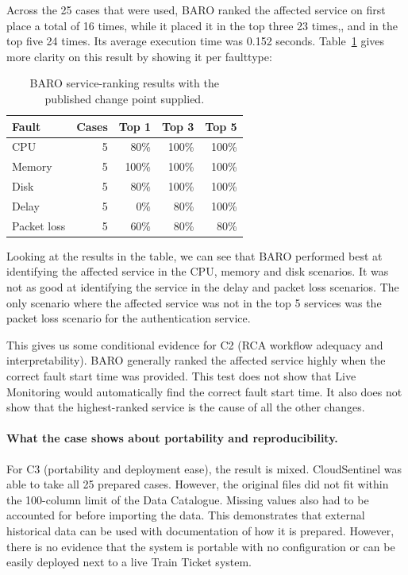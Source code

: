 Across the 25 cases that were used, BARO ranked the affected service on first place a total of 16 times, while it placed it in the top three 23 times,, and in the top five 24 times. Its average execution time was 0.152 seconds. Table~\ref{tab:h9-rcaeval-baro-results} gives more clarity on this result by showing it per faulttype:

\begin{table}[H]
    \centering
    \small
    \caption{BARO service-ranking results with the published change point supplied.}
    \label{tab:h9-rcaeval-baro-results}
    \begin{tabular}{|l|r|r|r|r|}
        \hline
        Fault & Cases & Top 1 & Top 3 & Top 5 \\
        \hline
        CPU & 5 & 80\% & 100\% & 100\% \\
        Memory & 5 & 100\% & 100\% & 100\% \\
        Disk & 5 & 80\% & 100\% & 100\% \\
        Delay & 5 & 0\% & 80\% & 100\% \\
        Packet loss & 5 & 60\% & 80\% & 80\% \\
        \hline
    \end{tabular}
\end{table}

Looking at the results in the table, we can see that BARO performed best at identifying the affected service in the CPU, memory and disk scenarios. It was not as good at identifying the service in the delay and packet loss scenarios. The only scenario where the affected service was not in the top 5 services was the packet loss scenario for the authentication service.

This gives us some conditional evidence for C2 (RCA workflow adequacy and interpretability). BARO generally ranked the affected service highly when the correct fault start time was provided. This test does not show that Live Monitoring would automatically find the correct fault start time. It also does not show that the highest-ranked service is the cause of all the other changes.

\paragraph{What the case shows about portability and reproducibility.}

For C3 (portability and deployment ease), the result is mixed. CloudSentinel was able to take all 25 prepared cases. However, the original files did not fit within the 100-column limit of the Data Catalogue. Missing values also had to be accounted for before importing the data. This demonstrates that external historical data can be used with documentation of how it is prepared. However, there is no evidence that the system is portable with no configuration or can be easily deployed next to a live Train Ticket system.

